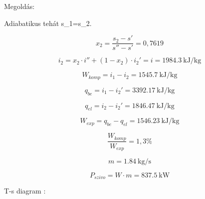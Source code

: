 \noindent Megoldás:
\vspace{2mm}

\noindent Adiabatikus tehát s_1=s_2.

\begin{equation}
x_2 = \frac{s_2-s'}{s''-s'} =0,7619
\end{equation}

\begin{equation}
i_2=x_2\cdot i''+(1-x_2)\cdot i_2'=i = \SI{1984,3}{\kilo\joule\per\kilogram}
\end{equation}

\begin{equation}
W_{komp}=i_1-i_2=\SI{1545,7}{\kilo\joule\per\kilogram}
\end{equation}

\begin{equation}
q_{be}=i_1-i_2'=\SI{3392,17}{\kilo\joule\per\kilogram}
\end{equation}

\begin{equation}
q_{el}=i_2-i_2'=\SI{1846,47}{\kilo\joule\per\kilogram}
\end{equation}

\begin{equation}
W_{exp}=q_{be}-q_{el}=\SI{1546,23}{\kilo\joule\per\kilogram}
\end{equation}

\begin{equation}
\frac{W_{komp}}{W_{exp}}=1,3 \%
\end{equation}

\begin{equation}
m= \SI{1,84}{\kilogram\per\second}
\end{equation}

\begin{equation}
P_{szivo} = W \cdot m =\SI{837,5}{\kilo\watt}
\end{equation}






\noindent T-s diagram :
\vspace{2mm}
